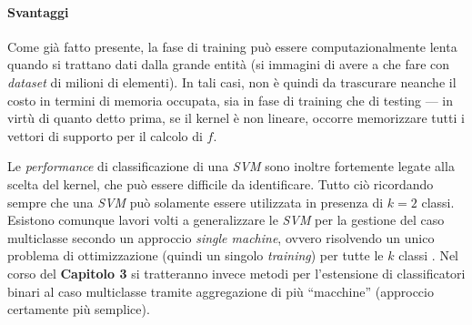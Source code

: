 \paragraph{Svantaggi}
Come già fatto presente, la fase di training può essere computazionalmente lenta quando si trattano dati dalla grande entità (si immagini di avere a che fare con \textit{dataset} di milioni di elementi). In tali casi, non è quindi da trascurare neanche il costo in termini di memoria occupata, sia in fase di training che di testing --- in virtù di quanto detto prima, se il kernel è non lineare, occorre memorizzare tutti i vettori di supporto per il calcolo di $f$.

Le \textit{performance} di classificazione di una \textit{SVM} sono inoltre fortemente legate alla scelta del kernel, che può essere difficile da identificare. Tutto ciò ricordando sempre che una \textit{SVM} può solamente essere utilizzata in presenza di $k = 2$ classi. Esistono comunque lavori volti a generalizzare le \textit{SVM} per la gestione del caso multiclasse secondo un approccio \textit{single machine}, ovvero risolvendo un unico problema di ottimizzazione (quindi un singolo \textit{training}) per tutte le $k$ classi \cite{tutorial}. Nel corso del \textbf{Capitolo 3} si tratteranno invece metodi per l'estensione di classificatori binari al caso multiclasse tramite aggregazione di più ``macchine'' (approccio certamente più semplice).

%